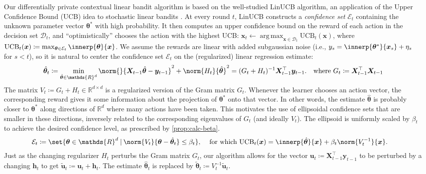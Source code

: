 \documentclass{article}
\renewcommand{\vec}[1]{\bm{#1}}
\newcommand{\defeq}{\coloneq}
\newcommand{\inv}[1]{#1^{-1}}
\newcommand{\Real}{\mathds{R}}
\newcommand{\UCB}{\mathrm{UCB}}
\newcommand{\argmax}{\operatorname*{arg\,max}}
\newcommand\given[1][\delimsize]{%
  \providecommand{\delimsize}{}
  \nonscript\:#1\vert\allowbreak\nonscript\:\mathopen{}
}
\newcommand{\D}{\mathcal{D}}
\newcommand{\E}{\mathcal{E}}
\providecommand\transp{\top}
\let\transpsymbol\transp
\renewcommand{\transp}[1]{#1^\transpsymbol}
\newcommand{\XtX}[1]{\transp{#1}{#1}}
\begin{document}
Our differentially private contextual linear bandit algorithm is based
on the well-studied LinUCB algorithm, an application of the Upper
Confidence Bound (UCB) idea to stochastic linear bandits
\citep{DaniStochasticLinearOptimization2008,RusmevichientongLinearlyParameterizedBandits2010,AbbasiYadkoriImprovedAlgorithmsLinear2011}.
At every round $t$, LinUCB constructs a \emph{confidence set} $\E_t$
containing the unknown parameter vector $\vec\theta^*$ with high
probability.  It then computes an upper confidence bound on the reward
of each action in the decision set $\D_t$, and ``optimistically''
chooses the action with the highest UCB:
$\vec x_t \gets \argmax_{\vec x\in\D_t} \UCB_t(\vec x)$, where
$\UCB_t(\vec x) \defeq \max_{\vec\theta\in\E_t}
\innerp{\vec\theta}{\vec x}$.  We assume the rewards are linear with
added subgaussian noise (i.e.,
$y_s = \innerp{\vec\theta^*}{\vec x_s} + \eta_s$ for $s<t$), so it is
natural to center the confidence set $\E_t$ on the (regularized)
linear regression estimate:
\begin{align*}
  \hat{\vec\theta}_t
  &\defeq \min_{\hat{\vec\theta} \in \Real^d} \norm{}{\vec X_{t-1} \hat{\vec\theta}
    - \vec y_{t-1}}^2 + \norm{H_t}{\hat{\vec\theta}}^2
    = \inv{(G_t + H_t)} \transp{\vec X_{t-1}} \vec y_{t-1}.
    &\text{where } G_t \defeq \XtX{\vec X_{t-1}}
\end{align*}
The matrix $V_t \defeq G_t + H_t \in \Real^{d\times d}$ is a regularized
version of the Gram matrix $G_t$.  Whenever the learner chooses an
action vector, the corresponding reward gives it some information
about the projection of $\vec\theta^*$ onto that vector.  In other
words, the estimate $\hat{\vec\theta}$ is probably closer to
$\vec\theta^*$ along directions of $\Real^d$ where many actions have
been taken.  This motivates the use of ellipsoidal confidence sets
that are smaller in these directions, inversely related to the
corresponding eigenvalues of $G_t$ (and ideally $V_t$). The ellipsoid
is uniformly scaled by $\beta_t$ to achieve the desired confidence
level, as prescribed by \cref{prop:calc-beta}.
\begin{align}\label{eq:def-ellip}
  \E_t &\defeq \set{\vec\theta\in\Real^d \given
        \norm{V_t}{\vec\theta-\hat{\vec\theta}_t} \le \beta_t},
  &\text{ for which }
    \UCB_t(\vec x) &= \innerp{\hat{\vec\theta}}{\vec x} + \beta_t\norm{\inv{V_t}}{\vec x}.
\end{align}
Just as the changing regularizer $H_t$ perturbs the Gram matrix $G_t$,
our algorithm allows for the vector
$\vec u_t \defeq \transp{\vec X_{t-1}} \vec y_{t-1}$ to be perturbed
by a changing $\vec h_t$ to get
$\tilde{\vec u}_t \defeq \vec u_t + \vec h_t$.  The estimate
$\hat{\vec\theta}_t$ is replaced by
$\tilde{\vec\theta}_t \defeq \inv{V_t}\tilde{\vec u}_t$.
\end{document}
